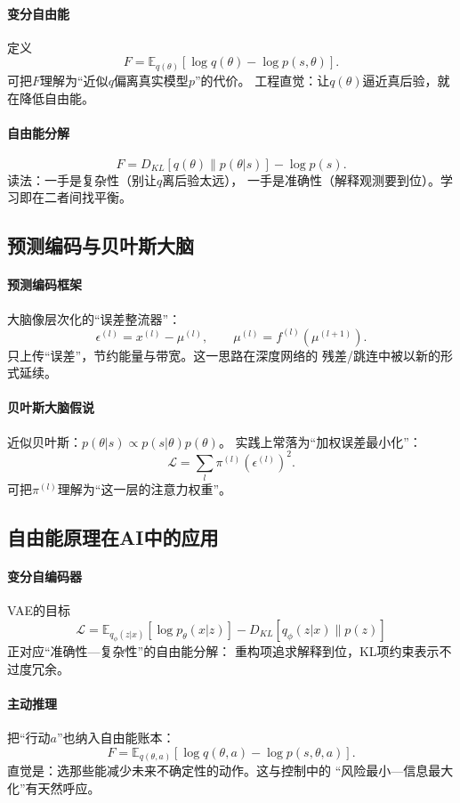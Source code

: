 \paragraph{变分自由能}
定义
$$F=\mathbb{E}_{q(\theta)}[\log q(\theta)-\log p(s,\theta)].$$
可把$F$理解为“近似$q$偏离真实模型$p$”的代价。  
工程直觉：让$q(\theta)$逼近真后验，就在降低自由能。

\paragraph{自由能分解}
$$F=D_{KL}[q(\theta)\|p(\theta|s)]-\log p(s).$$
读法：一手是复杂性（别让$q$离后验太远），  
一手是准确性（解释观测要到位）。\;学习即在二者间找平衡。

\subsection{预测编码与贝叶斯大脑}

\paragraph{预测编码框架}
大脑像层次化的“误差整流器”：  
$$\epsilon^{(l)}=x^{(l)}-\mu^{(l)},\qquad \mu^{(l)}=f^{(l)}(\mu^{(l+1)}).$$
只上传“误差”，节约能量与带宽。\;这一思路在深度网络的  
残差/跳连中被以新的形式延续。

\paragraph{贝叶斯大脑假说}
近似贝叶斯：$p(\theta|s)\propto p(s|\theta)p(\theta)$。  
实践上常落为“加权误差最小化”：
$$\mathcal{L}=\sum_l \pi^{(l)}(\epsilon^{(l)})^2.$$
可把$\pi^{(l)}$理解为“这一层的注意力权重”。

\subsection{自由能原理在AI中的应用}

\paragraph{变分自编码器}
VAE的目标
$$\mathcal{L}=\mathbb{E}_{q_\phi(z|x)}[\log p_\theta(x|z)]-D_{KL}[q_\phi(z|x)\|p(z)]$$
正对应“准确性—复杂性”的自由能分解：  
重构项追求解释到位，KL项约束表示不过度冗余。

\paragraph{主动推理}
把“行动$a$”也纳入自由能账本：
$$F=\mathbb{E}_{q(\theta,a)}[\log q(\theta,a)-\log p(s,\theta,a)].$$
直觉是：选那些能减少未来不确定性的动作。\;这与控制中的  
“风险最小—信息最大化”有天然呼应。

